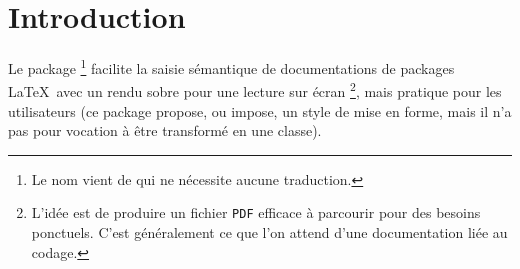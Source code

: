 \documentclass[12pt, a4paper]{article}
\begin{document}
\section{Introduction}

Le package 
\footnote{
    Le nom vient de  qui ne nécessite aucune traduction.
}
facilite la saisie sémantique de documentations de packages \LaTeX\ avec un rendu sobre pour une lecture sur écran
\footnote{
    L'idée est de produire un fichier \texttt{PDF} efficace à parcourir pour des besoins ponctuels. C'est généralement ce que l'on attend d'une documentation liée au codage.
},
mais pratique pour les utilisateurs (ce package propose, ou impose, un style de mise en forme, mais il n'a pas pour vocation à être transformé en une classe).
\end{document}
